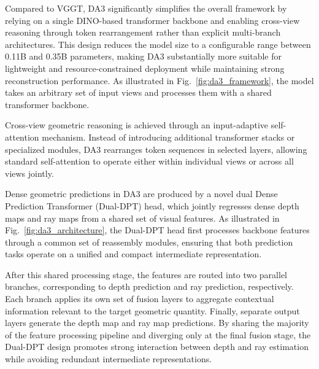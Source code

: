 Compared to VGGT, DA3 significantly simplifies the overall framework by relying on a single DINO-based transformer backbone and enabling cross-view reasoning through token rearrangement rather than explicit multi-branch architectures. This design reduces the model size to a configurable range between 0.11B and 0.35B parameters, making DA3 substantially more suitable for lightweight and resource-constrained deployment while maintaining strong reconstruction performance. As illustrated in Fig.~\ref{fig:da3_framework}, the model takes an arbitrary set of input views and processes them with a shared transformer backbone.

Cross-view geometric reasoning is achieved through an input-adaptive self-attention mechanism. Instead of introducing additional transformer stacks or specialized modules, DA3 rearranges token sequences in selected layers, allowing standard self-attention to operate either within individual views or across all views jointly.

Dense geometric predictions in DA3 are produced by a novel dual Dense Prediction Transformer (Dual-DPT) head, which jointly regresses dense depth maps and ray maps from a shared set of visual features. As illustrated in Fig.~\ref{fig:da3_architecture}, the Dual-DPT head first processes backbone features through a common set of reassembly modules, ensuring that both prediction tasks operate on a unified and compact intermediate representation.

After this shared processing stage, the features are routed into two parallel branches, corresponding to depth prediction and ray prediction, respectively. Each branch applies its own set of fusion layers to aggregate contextual information relevant to the target geometric quantity. Finally, separate output layers generate the depth map and ray map predictions. By sharing the majority of the feature processing pipeline and diverging only at the final fusion stage, the Dual-DPT design promotes strong interaction between depth and ray estimation while avoiding redundant intermediate representations.

